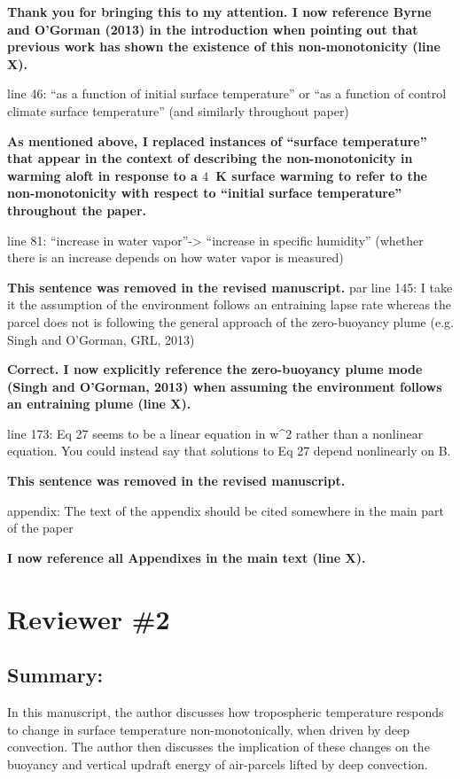 \documentclass{article}
\begin{document}
\par
\textbf{Thank you for bringing this to my attention. I now reference Byrne and O'Gorman (2013) in the introduction when pointing out that previous work has shown the existence of this non-monotonicity (line X).}
\par
line 46: ``as a function of initial surface temperature'' or ``as a function of control climate surface temperature'' (and similarly throughout paper)
\par
\textbf{As mentioned above, I replaced instances of ``surface temperature'' that appear in the context of describing the non-monotonicity in warming aloft in response to a $4$~K surface warming to refer to the non-monotonicity with respect to ``initial surface temperature'' throughout the paper.}
\par
line 81: ``increase in water vapor''-> ``increase in specific humidity'' (whether there is an increase depends on how water vapor is measured)
\par
\textbf{This sentence was removed in the revised manuscript.}
par
line 145: I take it the assumption of the environment follows an entraining lapse rate whereas the parcel does not is following the general approach of the zero-buoyancy plume (e.g. Singh and O'Gorman, GRL, 2013)
\par
\textbf{Correct. I now explicitly reference the zero-buoyancy plume mode (Singh and O'Gorman, 2013) when assuming the environment follows an entraining plume (line X).}
\par
line 173: Eq 27 seems to be a linear equation in w\^{}2 rather than a nonlinear equation. You could instead say that solutions to Eq 27 depend nonlinearly on B.
\par
\textbf{This sentence was removed in the revised manuscript.}
\par
appendix: The text of the appendix should be cited somewhere in the main part of the paper
\par
\textbf{I now reference all Appendixes in the main text (line X).}
\par
\section{Reviewer \#2}
\subsection{Summary:}
In this manuscript, the author discusses how tropospheric temperature responds to change in surface temperature non-monotonically, when driven by deep convection. The author then discusses the implication of these changes on the buoyancy and vertical updraft energy of air-parcels lifted by deep convection.
\end{document}
